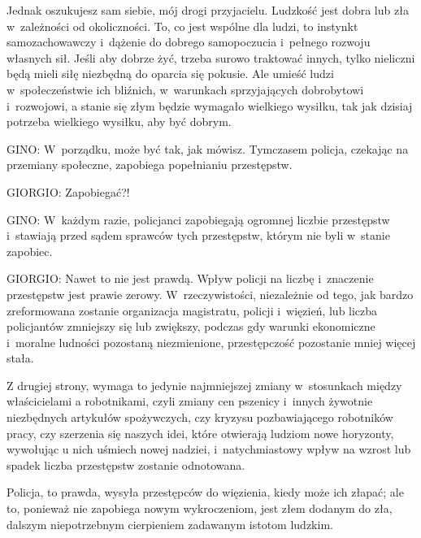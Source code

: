 \documentclass[oneside,polish,11pt,sfheadings]{mwbk}
\begin{document}
 
Jednak oszukujesz sam siebie, mój drogi przyjacielu. Ludzkość jest dobra lub zła w~zależności od okoliczności. To, co
jest wspólne dla ludzi, to instynkt samozachowawczy i~dążenie do dobrego samopoczucia i~pełnego rozwoju własnych sił.
Jeśli aby dobrze żyć, trzeba surowo traktować innych, tylko nieliczni będą mieli siłę niezbędną do oparcia się pokusie.
Ale umieść ludzi w~społeczeństwie ich bliźnich, w~warunkach sprzyjających dobrobytowi i~rozwojowi, a stanie się złym
będzie wymagało wielkiego wysiłku, tak jak dzisiaj potrzeba wielkiego wysiłku, aby być dobrym. 




 
\noindent \noindent GINO: W~porządku, może być tak, jak mówisz. Tymczasem policja, czekając na przemiany społeczne, zapobiega popełnianiu
przestępstw. 




 
\noindent GIORGIO: Zapobiegać?! 




 
\noindent \noindent GINO: W~każdym razie, policjanci zapobiegają ogromnej liczbie przestępstw i~stawiają przed sądem sprawców tych
przestępstw, którym nie byli w~stanie zapobiec. 




 
\noindent GIORGIO: Nawet to nie jest prawdą. Wpływ policji na liczbę i~znaczenie przestępstw jest prawie zerowy. W~rzeczywistości,
niezależnie od tego, jak bardzo zreformowana zostanie organizacja magistratu, policji i~więzień, lub liczba policjantów
zmniejszy się lub zwiększy, podczas gdy warunki ekonomiczne i~moralne ludności pozostaną niezmienione, przestępczość
pozostanie mniej więcej stała. 

 
Z drugiej strony, wymaga to jedynie najmniejszej zmiany w~stosunkach między właścicielami a robotnikami, czyli zmiany
cen pszenicy i~innych żywotnie niezbędnych artykułów spożywczych, czy kryzysu pozbawiającego robotników pracy, czy
szerzenia się naszych idei, które otwierają ludziom nowe horyzonty, wywołując u nich uśmiech nowej nadziei, i~natychmiastowy wpływ na wzrost lub spadek liczba przestępstw zostanie odnotowana. 

 
Policja, to prawda, wysyła przestępców do więzienia, kiedy może ich złapać; ale to, ponieważ nie zapobiega nowym
wykroczeniom, jest złem dodanym do zła, dalszym niepotrzebnym cierpieniem zadawanym istotom ludzkim. 
\end{document}
